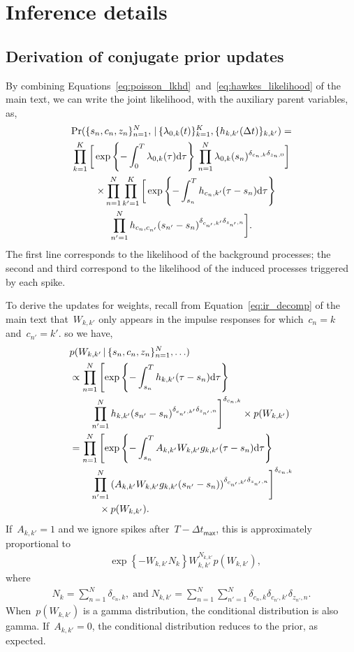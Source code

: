 \section{Inference details}
\subsection{Derivation of conjugate prior updates}
By combining Equations~\ref{eq:poisson_lkhd}~and~\ref{eq:hawkes_likelihood} of the main text, we can write the joint likelihood, with the auxiliary parent variables, as,
\begin{multline}
  \label{eq:complete_likelihood}
  \Pr(\{s_n,c_n,z_n\}^N_{n=1},\,|\, \{\lambda_{0,k}(t)\}^K_{k=1}, \{h_{k,k'}(\Delta t)\}_{k,k'}) = \\
  \prod^K_{k=1} \bigg[
  \exp\left\{ -\int_0^T \lambda_{0,k}(\tau)\mathrm{d}\tau \right\} \,
  \prod^N_{n=1}
   \lambda_{0,k}(s_n)^{\delta_{c_n,k}\delta_{z_n,0}} \bigg]\\
  \quad\times \prod_{n=1}^N\prod_{k'=1}^K \bigg[
  \exp\left\{-\int^T_{s_n} h_{c_n,k'}(\tau - s_n)\mathrm{d}\tau \right\}\\
  \prod^N_{n'=1} h_{c_n,c_{n'}}(s_{n'}-s_n)^{\delta_{c_{n'},k'}\delta_{z_{n'},n}}\bigg].
\end{multline}
The first line corresponds to the likelihood of the background processes; the second and third correspond to the likelihood of the induced processes triggered by each spike.

To derive the updates for weights, recall from Equation~\ref{eq:ir_decomp} of the main text that~${W_{k,k'}}$ only appears in the impulse responses for which~${c_n=k}$ and~${c_{n'}=k'}$. so we have,
\begin{align*}
&p(W_{k,k'}\,|\, \{s_n,c_n,z_n\}^N_{n=1},\ldots) \\
&\propto\prod_{n=1}^N\left[ \exp\left\{-\int^T_{s_n} h_{k,k'}(\tau - s_n)\mathrm{d}\tau \right\}\right.\\
&\quad\quad\left.\prod_{n'=1}^N h_{k,k'}(s_{n'}-s_n)^{\delta_{c_{n'},k'}\delta_{z_{n'},n}}\right]^{\delta_{c_n,k}} \times p(W_{k,k'})\\
&=\prod_{n=1}^N\left[ \exp\left\{-\int^T_{s_n} A_{k,k'}W_{k,k'}g_{k,k'}(\tau - s_n)\mathrm{d}\tau \right\}\right.\\
&\quad\quad\left.\prod_{n'=1}^N \left(A_{k,k'}W_{k,k'}g_{k,k'}(s_{n'}-s_n)\right)^{\delta_{c_{n'},k'}\delta_{z_{n'},n}}\right]^{\delta_{c_n,k}}\\
&\quad\quad\quad\times p(W_{k,k'}).
\end{align*}
If~${A_{k,k'}=1}$ and we ignore spikes after~${T-\Delta t_{\mathsf{max}}}$, this is approximately proportional to
\begin{align*}
&\exp\left\{-W_{k,k'}N_k\right\} W_{k,k'}^{N_{k,k'}} p(W_{k,k'}),
\end{align*}
where
\begin{align*}
N_{k}=\sum_{n=1}^N \delta_{c_n,k},\;\text{and}\;
N_{k,k'}=\sum_{n=1}^N\sum_{n'=1}^N \delta_{c_n,k}\delta_{c_{n'},k'}\delta_{z_{n'},n}.
\end{align*}
When~${p(W_{k,k'})}$ is a gamma distribution, the conditional distribution is also gamma. If~${A_{k,k'}=0}$, the conditional distribution reduces to the prior, as expected.

